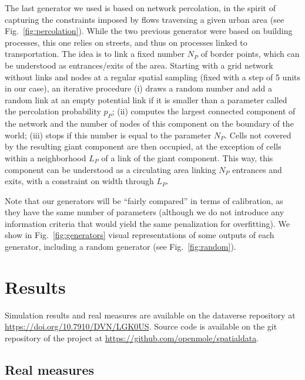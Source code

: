 \documentclass[letterpaper]{article}
\begin{document}
The last generator we used is based on network percolation, in the spirit of capturing the constraints imposed by flows traversing a given urban area (see Fig.~\ref{fig:percolation}). While the two previous generator were based on building processes, this one relies on streets, and thus on processes linked to transportation. The idea is to link a fixed number $N_P$ of border points, which can be understood as entrances/exits of the area. Starting with a grid network without links and nodes at a regular spatial sampling (fixed with a step of 5 units in our case), an iterative procedure (i) draws a random number and add a random link at an empty potential link if it is smaller than a parameter called the percolation probability $p_P$; (ii) computes the largest connected component of the network and the number of nodes of this component on the boundary of the world; (iii) stops if this number is equal to the parameter $N_P$. Cells not covered by the resulting giant component are then occupied, at the exception of cells within a neighborhood $L_P$ of a link of the giant component. This way, this component can be understood as a circulating area linking $N_P$ entrances and exits, with a constraint on width through $L_P$.


Note that our generators will be ``fairly compared'' in terms of calibration, as they have the same number of parameters (although we do not introduce any information criteria that would yield the same penalization for overfitting).
We show in Fig.~\ref{fig:generators} visual representations of some outputs of each generator, including a random generator (see Fig.~\ref{fig:random}).


\section{Results} \label{sec:results}

Simulation results and real measures are available on the dataverse repository at \url{https://doi.org/10.7910/DVN/LGK0US}. Source code is available on the git repository of the project at \url{https://github.com/openmole/spatialdata}.


\subsection{Real measures}
\end{document}
